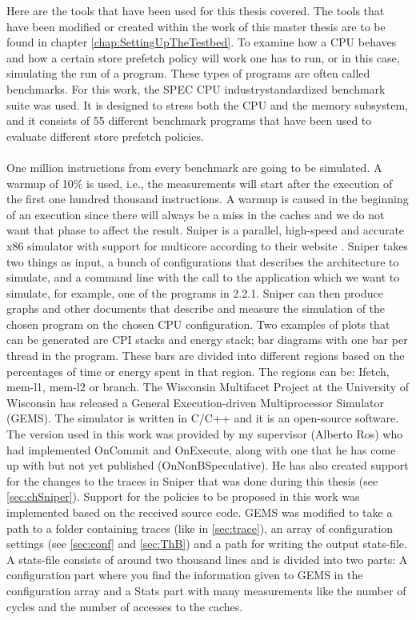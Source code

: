 Here are the tools that have been used for this thesis covered. The tools that have been modified or created within the work of this master thesis
are to be found in chapter \ref{chap:SettingUpTheTestbed}.
To examine how a CPU behaves and how a certain store prefetch policy will work
one has to run, or in this case, simulating the run of a program. These types of programs are often called benchmarks. For this work, the SPEC CPU  industrystandardized benchmark suite \cite{specCpu} was used. It is designed to stress both the CPU and the memory subsystem, and it consists of 55 different benchmark programs that have been used to evaluate different store prefetch policies.
\\ \\
One million instructions from every benchmark are going to be simulated. A warmup of 10\% is used, i.e., the measurements will start after the execution of the first one hundred thousand instructions. A warmup is caused in the beginning of an execution since there will always be a miss in the caches and we do not want that phase to affect the result.
Sniper is a parallel, high-speed and accurate x86 simulator with support for multicore
according to their website \cite{sniper}. Sniper takes two things as input, a bunch of configurations
that describes the architecture to simulate, and a command line with the call to
the application which we want to simulate, for example, one of the programs in 2.2.1.
Sniper can then produce graphs and other documents that describe and measure the
simulation of the chosen program on the chosen CPU configuration. Two examples
of plots that can be generated are CPI stacks \cite{cpi} and energy stack; bar diagrams with one bar per thread in the program. These bars are divided into different regions
based on the percentages of time or energy spent in that region. The regions can be:
Ifetch, mem-l1, mem-l2 or branch.
The Wisconsin Multifacet Project at the University of Wisconsin has released a General
Execution-driven Multiprocessor Simulator (GEMS). The simulator is written in
 C/C++ and it is an open-source software. The version used in this work was provided
by my supervisor (Alberto Ros) who had implemented OnCommit and OnExecute,
along with one that he has come up with but not yet published (OnNonBSpeculative).
He has also created support for the changes to the traces in Sniper that was done
during this thesis (see \ref{sec:chSniper}). Support for the policies to be proposed in this work was
implemented based on the received source code. 
GEMS was modified to take a path
to a folder containing traces (like in \ref{sec:trace}), an array of configuration settings (see \ref{sec:conf} and \ref{sec:ThB}) and a path for writing the output stats-file. A stats-file consists of around
two thousand lines and is divided into two parts: A configuration part where you find the
information given to GEMS in the configuration array and a Stats part with many
measurements like the number of cycles and the number of accesses to the caches.

